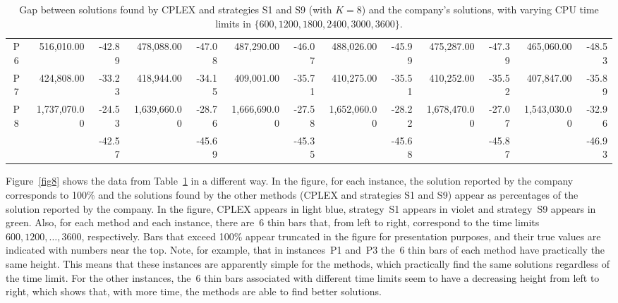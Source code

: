 \documentclass[11pt]{article}
\begin{document}
\begin{table}[ht!]
\begin{center}
{\begin{tabular}{|c|rr|rr|rr|rr|rr|rr|}
P6 & 516,010.00 & -42.89 & 478,088.00 & -47.08 & 487,290.00 & -46.07 & 488,026.00 & -45.99 & 475,287.00 & -47.39 & 465,060.00 & -48.53\\
P7 & 424,808.00 & -33.23 & 418,944.00 & -34.15 & 409,001.00 & -35.71 & 410,275.00 & -35.51 & 410,252.00 & -35.52 & 407,847.00 & -35.89\\
P8 & 1,737,070.00 & -24.53 & 1,639,660.00 & -28.76 & 1,666,690.00 & -27.58 & 1,652,060.00 & -28.22 & 1,678,470.00 & -27.07 & 1,543,030.00 & -32.96\\ 
\hline
&    & -42.57 &    & -45.69 &    & -45.35 &    & -45.68 &    & -45.87 &    & -46.93\\
\hline
\end{tabular}}
\end{center}
\caption{Gap between solutions found by CPLEX and strategies S1 and S9 (with $K=8$) and the company's solutions, with varying CPU time limits in $\{600, 1200, 1800, 2400, 3000, 3600\}$.}
\label{tab6}
\end{table}

Figure~\ref{fig8} shows the data from Table~\ref{tab6} in a different way. In the figure, for each instance, the solution reported by the company corresponds to 100\% and the solutions found by the other methods (CPLEX and strategies S1 and S9) appear as percentages of the solution reported by the company. In the figure, CPLEX appears in light blue, strategy~S1 appears in violet and strategy~S9 appears in green. Also, for each method and each instance, there are~6 thin bars that, from left to right, correspond to the time limits $600, 1200, \dots, 3600$, respectively. Bars that exceed 100\% appear truncated in the figure for presentation purposes, and their true values are indicated with numbers near the top. Note, for example, that in instances~P1 and~P3 the~6 thin bars of each method have practically the same height. This means that these instances are apparently simple for the methods, which practically find the same solutions regardless of the time limit. For the other instances, the~6 thin bars associated with different time limits seem to have a decreasing height from left to right, which shows that, with more time, the methods are able to find better solutions.
\end{document}
